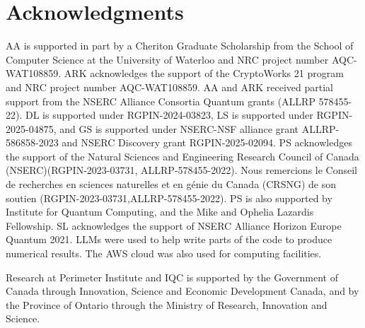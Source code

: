 \documentclass[11pt]{article}
\begin{document}
\section*{Acknowledgments}
AA is supported in part by a Cheriton Graduate Scholarship from the School of Computer Science at the University of Waterloo and NRC project number AQC-WAT108859. ARK acknowledges the support of the CryptoWorks 21 program and NRC project number AQC-WAT108859. AA and ARK received partial support from the NSERC Alliance Consortia Quantum grants (ALLRP 578455-22). DL is supported under RGPIN-2024-03823, LS is supported under RGPIN-2025-04875, and GS is supported under NSERC-NSF alliance grant ALLRP-586858-2023 and NSERC Discovery grant RGPIN-2025-02094. PS acknowledges the support of the Natural Sciences and Engineering
Research Council of Canada (NSERC)(RGPIN-2023-03731, ALLRP-578455-2022). Nous remercions le Conseil de recherches en sciences naturelles et en génie du Canada (CRSNG) de son soutien (RGPIN-2023-03731,ALLRP-578455-2022). PS is also supported by Institute for Quantum Computing, and the Mike and Ophelia Lazardis Fellowship. SL acknowledges the support of NSERC Alliance Horizon Europe Quantum 2021. LLMs were used to help write parts of the code to produce numerical results. The AWS cloud was also used for computing facilities.

Research at Perimeter Institute and IQC is supported by the Government of Canada through Innovation, Science and Economic Development
Canada, and by the Province of Ontario through the Ministry of Research, Innovation and Science.



\printbibliography





\appendix
\newcommand{\spec}{\mathrm{spec}}
\end{document}
